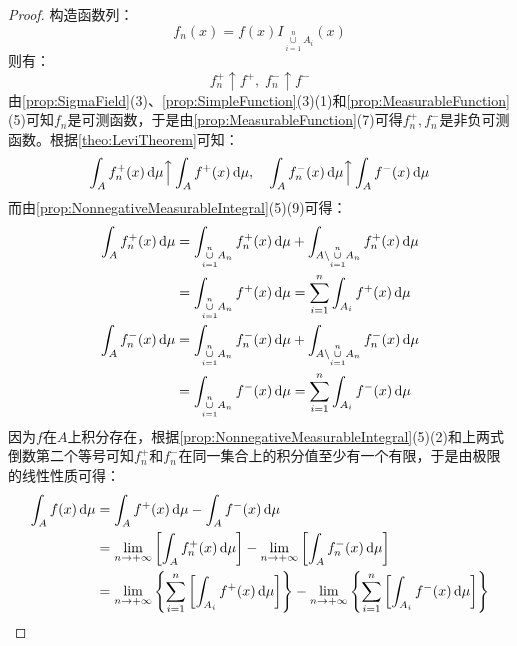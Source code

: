 \begin{proof}
	构造函数列：
	\begin{equation*}
		f_n(x)=f(x)I_{\underset{i=1}{\overset{n}{\cup}}A_i}(x)
	\end{equation*}
	则有：
	\begin{equation*}
		f_n^+\uparrow f^+,\;f_n^-\uparrow f^-
	\end{equation*}
	由\cref{prop:SigmaField}(3)、\cref{prop:SimpleFunction}(3)(1)和\cref{prop:MeasurableFunction}(5)可知$f_n$是可测函数，于是由\cref{prop:MeasurableFunction}(7)可得$f_n^+,f_n^-$是非负可测函数。根据\cref{theo:LeviTheorem}可知：
	\begin{equation*}
		\int_{A}f_n^+(x)\mathop{}\!\mathrm{d}\mu\Big\uparrow\int_{A}f^+(x)\mathop{}\!\mathrm{d}\mu,\quad\int_{A}f_n^-(x)\mathop{}\!\mathrm{d}\mu\Big\uparrow\int_{A}f^-(x)\mathop{}\!\mathrm{d}\mu
	\end{equation*}
	而由\cref{prop:NonnegativeMeasurableIntegral}(5)(9)可得：
	\begin{gather*}
		\begin{aligned}
			\int_{A}f_n^+(x)\dif\mu
			&=\int_{\underset{i=1}{\overset{n}{\cup}}A_n}f_n^+(x)\dif\mu+\int_{A\backslash\underset{i=1}{\overset{n}{\cup}}A_n}f_n^+(x)\dif\mu \\
			&=\int_{\underset{i=1}{\overset{n}{\cup}}A_n}f^+(x)\dif\mu
			=\sum_{i=1}^{n}\int_{A_i}f^+(x)\dif\mu
		\end{aligned} \\
		\begin{aligned}
			\int_{A}f_n^-(x)\dif\mu
			&=\int_{\underset{i=1}{\overset{n}{\cup}}A_n}f_n^-(x)\dif\mu+\int_{A\backslash\underset{i=1}{\overset{n}{\cup}}A_n}f_n^-(x)\dif\mu \\
			&=\int_{\underset{i=1}{\overset{n}{\cup}}A_n}f^-(x)\dif\mu
			=\sum_{i=1}^{n}\int_{A_i}f^-(x)\dif\mu
		\end{aligned} 
	\end{gather*}
	因为$f$在$A$上积分存在，根据\cref{prop:NonnegativeMeasurableIntegral}(5)(2)和上两式倒数第二个等号可知$f_n^+$和$f_n^-$在同一集合上的积分值至少有一个有限，于是由极限的线性性质可得：
	\begin{align*}
		\int_{A}f(x)\dif\mu&=\int_{A}f^+(x)\dif\mu-\int_{A}f^-(x)\dif\mu \\
		&=\lim_{n\to+\infty}\left[\int_{A}f_n^+(x)\dif\mu\right]-\lim_{n\to+\infty}\left[\int_{A}f_n^-(x)\dif\mu\right] \\
		&=\lim_{n\to+\infty}\left\{\sum_{i=1}^{n}\left[\int_{A_i}f^+(x)\dif\mu\right]\right\}-\lim_{n\to+\infty}\left\{\sum_{i=1}^{n}\left[\int_{A_i}f^-(x)\dif\mu\right]\right\} \\

\end{align*}
\end{proof}
